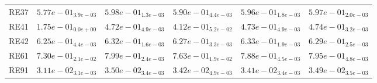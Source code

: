 \documentclass{article}
\begin{document}
\begin{table}
\begin{scriptsize}
\begin{tabular}{llllll}
RE37 & $  5.77e-01_{ 3.9e-03}$ & \cellcolor{gray95}$  5.98e-01_{ 1.3e-03}$ & $  5.90e-01_{ 4.4e-03}$ & $  5.96e-01_{ 1.8e-03}$ & \cellcolor{gray25}$  5.97e-01_{ 2.0e-03}$ \\
RE41 & $  1.75e-01_{ 0.0e+00}$ & $  4.72e-01_{ 4.9e-03}$ & $  4.12e-01_{ 5.2e-02}$ & \cellcolor{gray25}$  4.73e-01_{ 4.9e-03}$ & \cellcolor{gray95}$  4.74e-01_{ 3.2e-03}$ \\
RE42 & $  6.25e-01_{ 4.4e-03}$ & \cellcolor{gray25}$  6.32e-01_{ 1.6e-03}$ & $  6.27e-01_{ 3.3e-03}$ & \cellcolor{gray95}$  6.33e-01_{ 1.9e-03}$ & $  6.29e-01_{ 2.5e-03}$ \\
RE61 & $  7.30e-01_{ 2.1e-02}$ & \cellcolor{gray95}$  7.99e-01_{ 2.4e-03}$ & $  7.63e-01_{ 1.9e-02}$ & $  7.88e-01_{ 4.5e-03}$ & \cellcolor{gray25}$  7.95e-01_{ 4.8e-03}$ \\
RE91 & $  3.11e-02_{ 3.1e-03}$ & \cellcolor{gray95}$  3.50e-02_{ 3.4e-03}$ & $  3.42e-02_{ 4.9e-03}$ & $  3.41e-02_{ 3.4e-03}$ & \cellcolor{gray25}$  3.49e-02_{ 3.5e-03}$ \\
\hline
\end{tabular}
\end{scriptsize}
\end{table}
\end{document}
